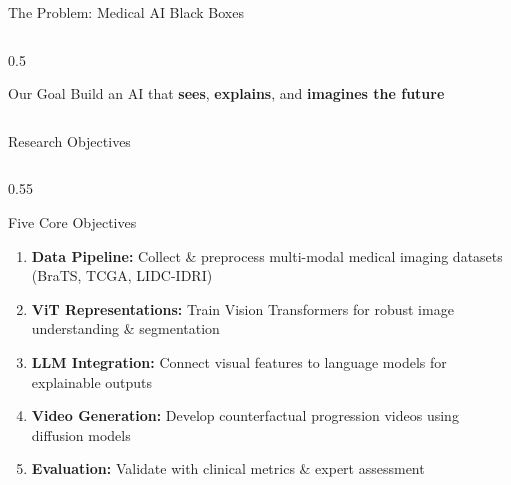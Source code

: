 \documentclass[aspectratio=169,xcolor=dvipsnames]{beamer}
\begin{document}
\begin{frame}{The Problem: Medical AI Black Boxes}
\begin{columns}
\begin{column}{0.5\textwidth}
            \vspace{0.5em}
            
            \begin{exampleblock}{Our Goal}
                Build an AI that \textbf{sees}, \textbf{explains}, and \textbf{imagines the future}
            \end{exampleblock}
        \end{column}
    \end{columns}
\end{frame}

\begin{frame}{Research Objectives}
    \begin{columns}
        \begin{column}{0.55\textwidth}
            \begin{block}{ Five Core Objectives}
                \begin{enumerate}
                    \item \textbf{Data Pipeline:} Collect \& preprocess multi-modal medical imaging datasets (BraTS, TCGA, LIDC-IDRI)
                    
                    \vspace{0.3em}
                    \item \textbf{ViT Representations:} Train Vision Transformers for robust image understanding \& segmentation
                    
                    \vspace{0.3em}
                    \item \textbf{LLM Integration:} Connect visual features to language models for explainable outputs
                    
                    \vspace{0.3em}
                    \item \textbf{Video Generation:} Develop counterfactual progression videos using diffusion models
                    
                    \vspace{0.3em}
                    \item \textbf{Evaluation:} Validate with clinical metrics \& expert assessment
                \end{enumerate}
            \end{block}
        \end{column}
        

\end{columns}
\end{frame}
\end{document}
